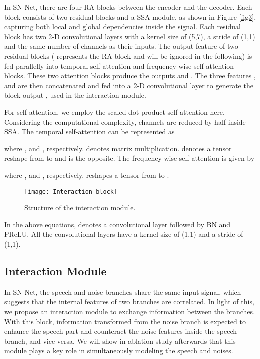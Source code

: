 \documentclass[letterpaper]{article} \usepackage{snnet}  \usepackage{times}  \usepackage{helvet} \usepackage{courier}  \usepackage[hyphens]{url}  \usepackage{graphicx} \urlstyle{rm} \def\UrlFont{\rm}  \usepackage{graphicx}  \usepackage{natbib}  \usepackage{caption} \usepackage{amsfonts}  \usepackage{amsmath}  \usepackage{multirow} \usepackage{tablefootnote}  \usepackage[switch]{lineno}
\begin{document}
In SN-Net, there are four RA blocks between the encoder and the decoder. Each block consists of two residual blocks and a SSA module, as shown in Figure \ref{fig3}, capturing both local and global dependencies inside the signal. Each residual block has two 2-D convolutional layers with a kernel size of (5,7), a stride of (1,1) and the same number of channels as their inputs. The output feature of two residual blocks  ( represents the  RA block and will be ignored in the following) is fed parallelly into temporal self-attention and frequency-wise self-attention blocks. These two attention blocks produce the outputs  and . The three features ,  and  are then concatenated and fed into a 2-D convolutional layer to generate the block output , used in the interaction module.

For self-attention, we employ the scaled dot-product self-attention here. Considering the computational complexity, channels are reduced by half inside SSA. The temporal self-attention can be represented as

where ,  and , respectively.  denotes matrix multiplication.  denotes a tensor reshape from  to  and  is the opposite. The frequency-wise self-attention is given by

where ,  and , respectively.  reshapes a tensor from  to .

\begin{figure}[t]
    \centering
    \texttt{[image: Interaction\_block]}
    \caption{Structure of the interaction module.}
    \label{fig4}
\end{figure}

In the above equations,  denotes a convolutional layer followed by BN and PReLU. All the convolutional layers have a kernel size of (1,1) and a stride of (1,1). 

\subsection{Interaction Module}

\noindent In SN-Net, the speech and noise branches share the same input signal, which suggests that the internal features of two branches are correlated. In light of this, we propose an interaction module to exchange information between the branches. With this block, information transformed from the noise branch is expected to enhance the speech part and counteract the noise features inside the speech branch, and vice versa. We will show in ablation study afterwards that this module plays a key role in simultaneously modeling the speech and noises. 
\end{document}
